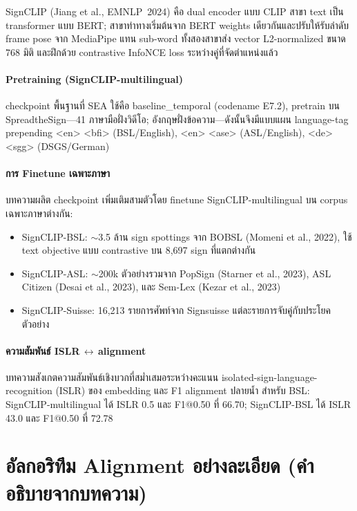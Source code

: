 \documentclass[11pt,a4paper]{article}
\def\texttt#1{#1}%
\def\emph#1{#1}%
\begin{document}
SignCLIP (Jiang et al., EMNLP~2024) คือ dual encoder แบบ CLIP
สาขา text เป็น transformer แบบ BERT; สาขาท่าทางเริ่มต้นจาก
BERT weights เดียวกันและปรับให้รับลำดับ frame pose จาก MediaPipe
แทน sub-word ทั้งสองสาขาส่ง vector L2-normalized ขนาด 768 มิติ
และฝึกด้วย contrastive InfoNCE loss ระหว่างคู่ที่จัดตำแหน่งแล้ว

\paragraph{Pretraining (\emph{SignCLIP-multilingual})}
checkpoint พื้นฐานที่ SEA ใช้คือ \texttt{baseline\_temporal}
(codename \texttt{E7.2}), pretrain บน SpreadtheSign---41 ภาษามือฝั่งวิดีโอ;
อังกฤษฝั่งข้อความ---ดังนั้นจึงมีแบบแผน language-tag prepending
\texttt{<en> <bfi>} (BSL/English), \texttt{<en> <ase>} (ASL/English),
\texttt{<de> <sgg>} (DSGS/German)

\paragraph{การ Finetune เฉพาะภาษา}
บทความผลิต checkpoint เพิ่มเติมสามตัวโดย finetune \emph{SignCLIP-multilingual}
บน corpus เฉพาะภาษาต่างกัน:
\begin{itemize}[leftmargin=1.5em]
  \item \emph{SignCLIP-BSL}: $\sim$3.5 ล้าน sign spottings จาก BOBSL
        (Momeni et al., 2022), ใช้ text objective แบบ contrastive บน 8,697 sign ที่แตกต่างกัน
  \item \emph{SignCLIP-ASL}: $\sim$200k ตัวอย่างรวมจาก PopSign
        (Starner et al., 2023), ASL Citizen (Desai et al., 2023), และ Sem-Lex (Kezar et al., 2023)
  \item \emph{SignCLIP-Suisse}: 16,213 รายการศัพท์จาก Signsuisse
        แต่ละรายการจับคู่กับประโยคตัวอย่าง
\end{itemize}

\paragraph{ความสัมพันธ์ ISLR$\,\leftrightarrow\,$alignment}
บทความสังเกตความสัมพันธ์เชิงบวกที่สม่ำเสมอระหว่างคะแนน
isolated-sign-language-recognition (ISLR) ของ embedding
และ F1 alignment ปลายน้ำ สำหรับ BSL:
SignCLIP-multilingual ได้ ISLR 0.5 และ F1@0.50 ที่ 66.70;
SignCLIP-BSL ได้ ISLR 43.0 และ F1@0.50 ที่ 72.78


\section{อัลกอริทึม Alignment อย่างละเอียด (คำอธิบายจากบทความ)}
\label{sec:paper-align}
\end{document}
